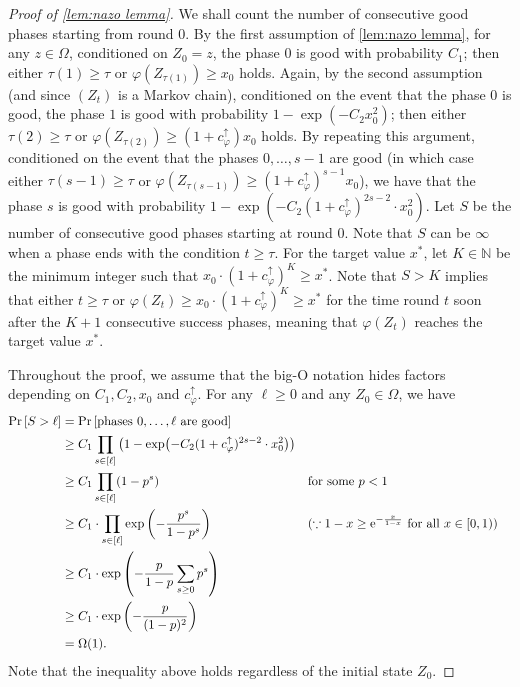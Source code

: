 \documentclass[letterpaper,11pt]{article}
\newcommand{\e}{\mathrm{e}}
\newcommand{\Nat}{\mathbb{N}}
\newcommand{\cphiup}{c_\varphi^{\uparrow}}
\begin{document}
\begin{proof}[Proof of \cref{lem:nazo lemma}]
    We shall count the number of consecutive good phases starting from round $ 0 $.
    By the first assumption of \cref{lem:nazo lemma}, for any $ z \in \Omega $, conditioned on $ Z_0 = z $,
    the phase $ 0 $ is good with probability $ C_1 $; then either $ \tau(1)\ge \tau $ or $ \varphi(Z_{\tau(1)}) \ge x_0$ holds.
    Again, by the second assumption (and since $ (Z_t) $ is a Markov chain), conditioned on the event that the phase $ 0 $ is good, the phase $ 1 $ is good with probability $ 1-\exp(-C_2 x_0^2) $; then either $ \tau(2) \ge \tau $ or $ \varphi(Z_{\tau(2)}) \ge (1 + \cphiup)x_0$ holds.
    By repeating this argument, conditioned on the event that the phases $0,\dots,s-1$ are good (in which case either $ \tau(s-1) \ge \tau $ or $ \varphi(Z_{\tau(s-1)}) \ge (1+\cphiup)^{s-1}x_0 $), we have that the phase $ s $ is good with probability $ 1-\exp(-C_2 (1+\cphiup)^{2s-2}\cdot x_0^2) $.
    Let $ S $ be the number of consecutive good phases starting at round $ 0 $.
    Note that $ S $ can be $ \infty $ when a phase ends with the condition $ t\ge \tau $.
    For the target value $ x^* $, let $ K\in\Nat $ be the minimum integer such that $ x_0 \cdot (1+\cphiup)^K \ge x^* $.
    Note that $ S>K $ implies that either $ t\ge \tau $ or $ \varphi(Z_t) \ge x_0 \cdot (1+\cphiup)^K \ge x^*$ for the time round $ t $ soon after the $ K+1 $ consecutive success phases, meaning that $ \varphi(Z_t) $ reaches the target value $ x^* $.

    Throughout the proof, we assume that the big-O notation hides factors depending on $C_1, C_2,x_0 $ and $ \cphiup $.
    For any $ \ell \ge 0 $ and any $ Z_0\in\Omega $, we have
    \begin{align*} 
        \Pr\qty[ S > \ell ] &= \Pr\qty[ \text{phases $0,\dots,\ell$ are good} ]  \\
        &\ge C_1 \prod_{s \in [\ell]} \qty( 1-\exp(-C_2 (1+\cphiup)^{2s-2}\cdot x_0^2) ) \\
        &\ge C_1 \prod_{s \in [\ell]} (1-p^s) & & \text{for some $ p <1$}\\
        &\ge C_1\cdot \prod_{s\in[\ell]} \exp\qty( -\frac{p^s}{1-p^s} ) & & (\because\text{$1-x \ge \e^{-\frac{x}{1-x}}$ for all $x\in[0,1)$}) \\
        &\ge C_1\cdot \exp\qty(-\frac{p}{1-p}\sum_{s\ge 0} p^s) \\
        &\ge C_1\cdot \exp\qty(-\frac{p}{(1-p)^2}) \\
        &=\Omega(1).
    \end{align*}
    Note that the inequality above holds regardless of the initial state $ Z_0 $.


\end{proof}
\end{document}
